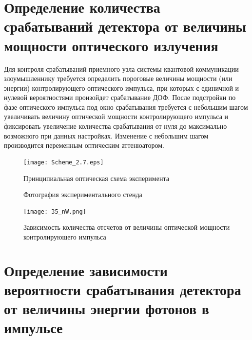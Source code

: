 \section{Определение количества срабатываний детектора от величины мощности оптического излучения} \label{sec:ch2/sec7}

Для контроля срабатываний приемного узла системы квантовой коммуникации злоумышленнику требуется определить пороговые величины мощности (или энергии) контролирующего оптического импульса, при которых с единичной и нулевой вероятностями произойдет срабатывание ДОФ. После подстройки по фазе оптического импульса под окно срабатывания требуется с небольшим шагом увеличивать величину оптической мощности контролирующего импульса и фиксировать увеличение количества срабатывания от нуля до максимально возможного при данных настройках. Изменение с небольшим шагом производится переменным оптическим аттенюатором.  
 \begin{figure}[ht]
  \centering
  \texttt{[image: Scheme\_2.7.eps]}
  \caption{Принципиальная оптическая схема эксперимента}
  \label{fig:Scheme_2.7}
\end{figure}


 \begin{figure}[ht]
  \centering
  \caption{Фотография экспериментального стенда}
  \label{fig:experimental_setup}
\end{figure}


 \begin{figure}[ht]
  \centering
  \texttt{[image: 35\_nW.png]}
  \caption{Зависимость количества отсчетов от величины оптической мощности контролирующего импульса}
  \label{fig:35_nW}
\end{figure}


\pagebreak






\pagebreak


\section{Определение зависимости вероятности срабатывания детектора от величины энергии фотонов в импульсе} \label{sec:ch2/sec8}

